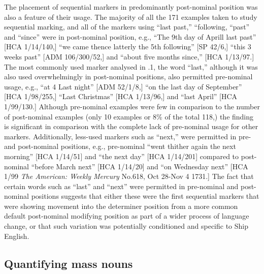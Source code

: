   The placement of sequential markers in predominantly post-nominal position was also a feature of their usage. The majority of all the 171 examples taken to study sequential marking, and all of the markers using “last past,” “following, “past” and “since” were in post-nominal position, e.g., “The 9th day of Aprill last past” [HCA 1/14/140,] “we came thence latterly the 5th following” [SP 42/6,] “this 3 weeks past” [ADM 106/300/52,] and “about five months since,” [HCA 1/13/97.] The most commonly used marker analysed in .1, the word “last,” although it was also used overwhelmingly in post-nominal positions, also permitted pre-nominal usage, e.g., “at 4 Last night” [ADM 52/1/8,] “on the last day of September” [HCA 1/98/255,] “Last Christmas” [HCA 1/13/96,] and “last April” [HCA 1/99/130.] Although pre-nominal examples were few in comparison to the number of post-nominal examples (only 10 examples or 8\% of the total 118,) the finding is significant in comparison with the complete lack of pre-nominal usage for other markers. Additionally, less-used markers such as “next,” were permitted in pre- and post-nominal positions, e.g., pre-nominal “went thither again the next morning” [HCA 1/14/51] and “the next day” [HCA 1/14/201] compared to post-nominal “before March next” [HCA 1/14/20] and “on Wednesday next” [HCA 1/99 \textit{The American: Weekly Mercury} No.618, Oct 28-Nov 4 1731.] The fact that certain words such as “last” and “next” were permitted in pre-nominal and post-nominal positions suggests that either these were the first sequential markers that were showing movement into the determiner position from a more common default post-nominal modifying position as part of a wider process of language change, or that such variation was potentially conditioned and specific to Ship English. 

\subsection{{Quantifying} {mass} {nouns}}%


